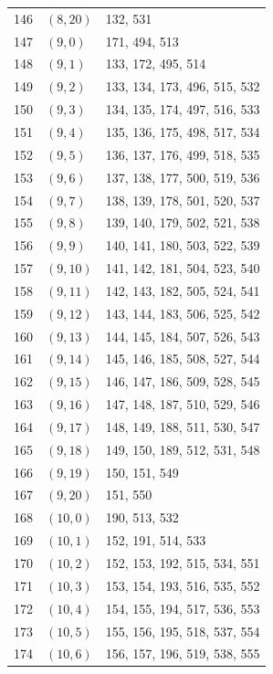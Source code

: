 \documentclass{article}
\begin{document}
\begin{longtable}{lll}
  146 & \((8, 20)\) & 132, 531 \\
  147 & \((9, 0)\) & 171, 494, 513 \\
  148 & \((9, 1)\) & 133, 172, 495, 514 \\
  149 & \((9, 2)\) & 133, 134, 173, 496, 515, 532 \\
  150 & \((9, 3)\) & 134, 135, 174, 497, 516, 533 \\
  151 & \((9, 4)\) & 135, 136, 175, 498, 517, 534 \\
  152 & \((9, 5)\) & 136, 137, 176, 499, 518, 535 \\
  153 & \((9, 6)\) & 137, 138, 177, 500, 519, 536 \\
  154 & \((9, 7)\) & 138, 139, 178, 501, 520, 537 \\
  155 & \((9, 8)\) & 139, 140, 179, 502, 521, 538 \\
  156 & \((9, 9)\) & 140, 141, 180, 503, 522, 539 \\
  157 & \((9, 10)\) & 141, 142, 181, 504, 523, 540 \\
  158 & \((9, 11)\) & 142, 143, 182, 505, 524, 541 \\
  159 & \((9, 12)\) & 143, 144, 183, 506, 525, 542 \\
  160 & \((9, 13)\) & 144, 145, 184, 507, 526, 543 \\
  161 & \((9, 14)\) & 145, 146, 185, 508, 527, 544 \\
  162 & \((9, 15)\) & 146, 147, 186, 509, 528, 545 \\
  163 & \((9, 16)\) & 147, 148, 187, 510, 529, 546 \\
  164 & \((9, 17)\) & 148, 149, 188, 511, 530, 547 \\
  165 & \((9, 18)\) & 149, 150, 189, 512, 531, 548 \\
  166 & \((9, 19)\) & 150, 151, 549 \\
  167 & \((9, 20)\) & 151, 550 \\
  168 & \((10, 0)\) & 190, 513, 532 \\
  169 & \((10, 1)\) & 152, 191, 514, 533 \\
  170 & \((10, 2)\) & 152, 153, 192, 515, 534, 551 \\
  171 & \((10, 3)\) & 153, 154, 193, 516, 535, 552 \\
  172 & \((10, 4)\) & 154, 155, 194, 517, 536, 553 \\
  173 & \((10, 5)\) & 155, 156, 195, 518, 537, 554 \\
  174 & \((10, 6)\) & 156, 157, 196, 519, 538, 555 \\

\end{longtable}
\end{document}
